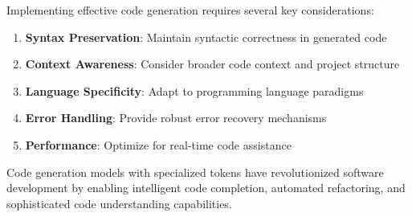 Implementing effective code generation requires several key considerations:

\begin{enumerate}
\item \textbf{Syntax Preservation}: Maintain syntactic correctness in generated code
\item \textbf{Context Awareness}: Consider broader code context and project structure
\item \textbf{Language Specificity}: Adapt to programming language paradigms
\item \textbf{Error Handling}: Provide robust error recovery mechanisms
\item \textbf{Performance}: Optimize for real-time code assistance
\end{enumerate}
\begin{comment}
Feedback: This is a good list. To make it more actionable for a developer:
1.  **Syntax Preservation**: "Instead of generating code token by token without constraints, use a syntax-aware decoding strategy. This could involve a parser that validates the next token, or a grammar-based approach that only allows syntactically valid tokens to be sampled."
2.  **Context Awareness**: "Don't just train on isolated code snippets. For better performance, pre-train on entire repositories. This allows the model to learn about dependencies between files, common API usage patterns, and project-level conventions."
3.  **Performance**: "For real-time code completion, model latency is critical. Consider using smaller, distilled models, quantization, and efficient attention mechanisms like FlashAttention to ensure suggestions appear instantly as the user types."
\end{comment}

Code generation models with specialized tokens have revolutionized software development by enabling intelligent code completion, automated refactoring, and sophisticated code understanding capabilities.